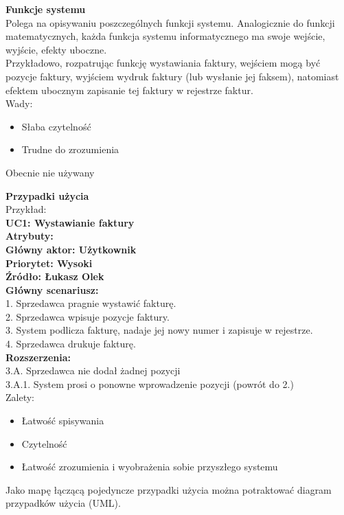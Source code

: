 \documentclass[12pt]{article}
\begin{document}
    \begin{definition}
        \textbf{Funkcje systemu} \\
        Polega na opisywaniu poszczególnych funkcji systemu. Analogicznie do funkcji matematycznych, każda funkcja systemu informatycznego ma swoje wejście, wyjście, efekty uboczne. \\
        Przykładowo, rozpatrując funkcję wystawiania faktury, wejściem mogą być pozycje faktury, wyjściem wydruk faktury (lub wysłanie jej faksem), natomiast efektem ubocznym zapisanie tej faktury w rejestrze faktur. \\

        Wady:
        \begin{itemize}
            \item Słaba czytelność
            \item Trudne do zrozumienia
        \end{itemize}

        Obecnie nie używany
    \end{definition}


    \begin{definition}
        \textbf{Przypadki użycia} \\
        Przykład: \\

        \textbf{UC1: Wystawianie faktury} \\
        \textbf{Atrybuty:} \\
        \textbf{Główny aktor: Użytkownik} \\
        \textbf{Priorytet: Wysoki} \\
        \textbf{Źródło: Łukasz Olek} \\

        \textbf{Główny scenariusz:} \\
        1. Sprzedawca pragnie wystawić fakturę. \\
        2. Sprzedawca wpisuje pozycje faktury. \\
        3. System podlicza fakturę, nadaje jej nowy numer i zapisuje w rejestrze. \\
        4. Sprzedawca drukuje fakturę. \\
        \textbf{Rozszerzenia:} \\
        3.A. Sprzedawca nie dodał żadnej pozycji \\
        3.A.1. System prosi o ponowne wprowadzenie pozycji (powrót do 2.) \\

        Zalety:
        \begin{itemize}
            \item Łatwość spisywania
            \item Czytelność
            \item Łatwość zrozumienia i wyobrażenia sobie przyszłego systemu
        \end{itemize}

        Jako mapę łączącą pojedyncze przypadki użycia można potraktować diagram przypadków użycia (UML).
    \end{definition}
\end{document}
